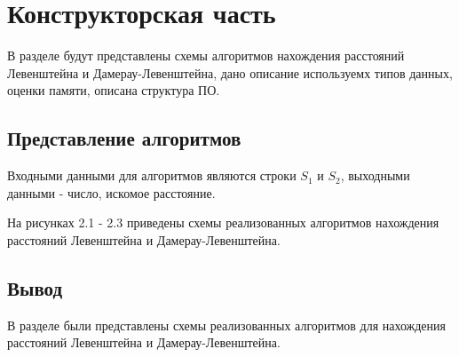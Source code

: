 \chapter{Конструкторская часть}
В разделе будут представлены схемы алгоритмов нахождения расстояний Левенштейна и Дамерау-Левенштейна, дано описание используемх типов данных, оценки памяти, описана структура ПО.
\section{Представление алгоритмов}
Входными данными для алгоритмов являются строки $S_1$ и $S_2$, выходными данными - число, искомое расстояние.

На рисунках 2.1 - 2.3 приведены схемы реализованных алгоритмов нахождения расстояний Левенштейна и Дамерау-Левенштейна.
\section*{Вывод}
В разделе были представлены схемы реализованных алгоритмов для нахождения расстояний Левенштейна и Дамерау-Левенштейна.

